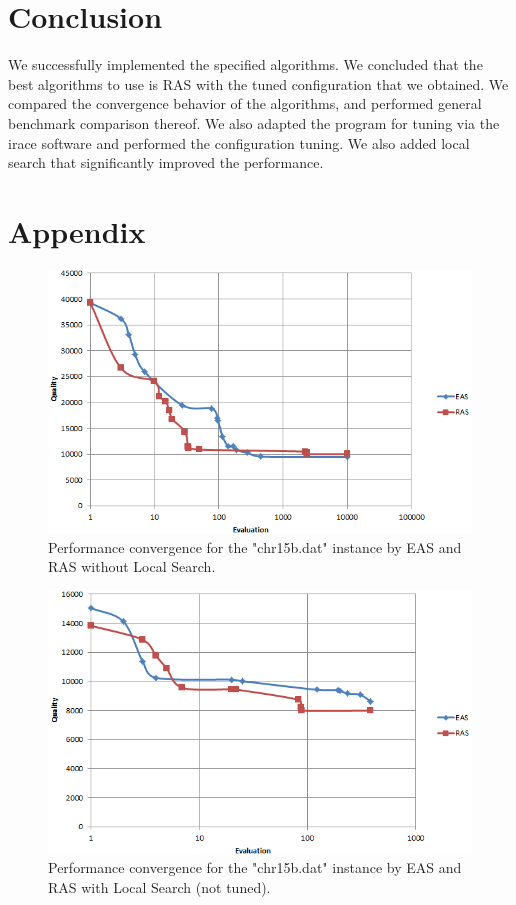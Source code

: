 \documentclass[12pt]{article}
\begin{document}
\section{Conclusion}

We successfully implemented the specified algorithms. We concluded that the best algorithms to use is RAS with the tuned configuration that we obtained. We compared the convergence behavior of the algorithms, and performed general benchmark comparison thereof. We also adapted the program for tuning via the irace software and performed the configuration tuning. We also added local search that significantly improved the performance.

\section{Appendix}

\begin{figure}[H]
  \centering
    \includegraphics[scale=0.56]{no-ls.PNG}
  \caption{Performance convergence for the "chr15b.dat" instance by EAS and RAS without Local Search.}
  \label{fig:convergence-no-ls}
\end{figure}

\begin{figure}[H]
  \centering
    \includegraphics[scale=0.56]{ls-not-tuned.PNG}
  \caption{Performance convergence for the "chr15b.dat" instance by EAS and RAS with Local Search (not tuned).}
  \label{fig:convergence-ls-not-tuned}
\end{figure}
\end{document}
